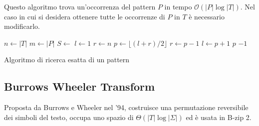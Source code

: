 Questo algoritmo trova un'occorrenza del pattern $P$ in tempo $\mathcal{O}(|P| \log |T|)$.
Nel caso in cui si desidera ottenere tutte le occorrenze di $P$ in $T$ è
necessario modificarlo.
\begin{algorithm}[!ht]
    \begin{algorithmic}
        \State $n \gets |T|$
        \State $m \gets |P|$
        \State $S \gets$ 
        \State $l \gets 1$
        \State $r \gets n$
        \State $p \gets \lfloor (l + r) / 2 \rfloor$
        \State $r \gets p - 1$
        \State $l \gets p + 1$
        \Else
        \State \Return $p$
        \EndIf
        \EndWhile
        \State \Return $-1$
        \EndFunction
    \end{algorithmic}
    \caption{Algoritmo di ricerca esatta di un pattern}
\end{algorithm}
\subsection{Burrows Wheeler Transform}
Proposta da Burrows e Wheeler nel '94, costruisce una permutazione reversibile
dei simboli del testo, occupa uno spazio di $\Theta(|T| \log |\Sigma|)$ ed è
usata in B-zip 2.

